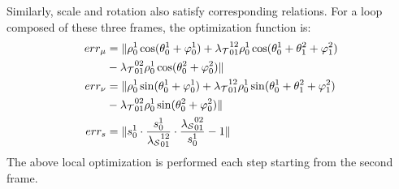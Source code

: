 \documentclass[letterpaper, 10 pt, conference]{ieeeconf}  %
\begin{document}
Similarly, scale and rotation also satisfy corresponding relations. For a loop composed of these three frames, the optimization function is:
\begin{equation}
    \centering
    \begin{aligned}
        err_{\mu} &= \| \rho_0^1 \cos(\theta_0^1 + \varphi_0^1) + {\lambda_{\mathcal{T}}}_{01}^{12}  \rho_0^1 \cos(\theta_0^1 + \theta_1^2 + \varphi_1^2) \\
        & - {\lambda_{\mathcal{T}}}_{01}^{02}  \rho_0^1 \cos(\theta_0^2 + \varphi_0^2) \| \\
        err_{\nu} &= \| \rho_0^1 \sin(\theta_0^1 + \varphi_0^1) + {\lambda_{\mathcal{T}}}_{01}^{12}  \rho_0^1 \sin(\theta_0^1 + \theta_1^2 + \varphi_1^2) \\
        & - {\lambda_{\mathcal{T}}}_{01}^{02}  \rho_0^1 \sin(\theta_0^2 + \varphi_0^2) \| \\
        err_{s} &= \| s_0^1 \cdot \frac{s_0^1}{{\lambda_{\mathcal{S}}}_{01}^{12}} \cdot \frac{{\lambda_{\mathcal{S}}}_{01}^{02}}{s_0^1} - 1 \| \\ 
    \end{aligned}
\end{equation}
The above local optimization is performed each step starting from the second frame. 
\end{document}
